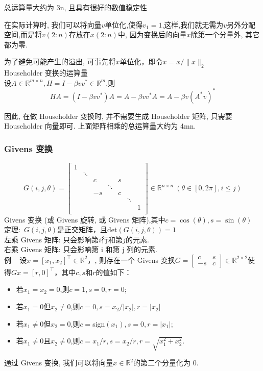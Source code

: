 \documentclass[12pt,a4paper]{article}
\begin{document}
总运算量大约为 3n, 且具有很好的数值稳定性

在实际计算时, 我们可以将向量$v$单位化,使得$v_1=1$,这样,我们就无需为$v$另外分配空间,而是将$v(2:n)$存放在$x(2:n)$中, 因为变换后的向量$x$除第一个分量外, 其它都为零.

为了避免可能产生的溢出, 可事先将$x$单位化，即令$x=x/\|x\|_2$\\

\noindent Householder 变换的运算量\\
设$A \in \mathbb{R}^{m \times n}, H=I-\beta v v^{*} \in \mathbb{R}^{m}$,则$$
H A=\left(I-\beta v v^{*}\right) A=A-\beta v v^{*} A=A-\beta v\left(A^{*} v\right)^{*}
$$

因此, 在做 Householder 变换时, 并不需要生成 Householder 矩阵, 只需要
Householder 向量即可. 上面矩阵相乘的总运算量大约为 4mn.
\subsubsection{Givens 变换}
$$G(i,j,\theta)=
\begin{bmatrix}
1& & & & & & \\
&\ddots& & & & & \\
& &c& &s& & \\
& & & \ddots& & & \\
& &-s& &c & & \\
& & & & &\ddots& \\
&&&&&&1\\
\end{bmatrix}\in \mathbb{R}^{n\times n} ~(\theta \in [0,2 \pi],i\leqslant j)
$$
Givens 变换 (或 Givens 旋转, 或 Givens 矩阵),其中$c=\cos(\theta),s=\sin (\theta)$\\

\noindent 定理:~$G(i,j,\theta)$是正交矩阵，且det$(G(i,j,\theta))=1$\\

\noindent 左乘 Givens 矩阵: 只会影响第$i$行和第$j$的元素.\\
右乘 Givens 矩阵: 只会影响第 i 和第 j 列的元素.\\

\noindent 例 ~ 设$x=\left[x_{1}, x_{2}\right]^{\top} \in \mathbb{R}^{2}$，, 则存在一个 Givens 变换$G=\left[\begin{array}{cc}{c} & {s} \\ {-s} & {c}\end{array}\right] \in \mathbb{R}^{2 \times 2}$使得$G x=[r, 0]^{\top}$，其中$c,s$和$r$的值如下：
\begin{itemize}
	\item {若$x_1=x_2=0$,则$c=1,s=0,r=0$;}
	\item{若$x_1=0$但$x_2\ne0$,则$c=0,s=x_2/\left|x_2\right|,r=\left|x_2\right|$}
	\item 若$x_1\ne 0$但$x_2=0$,则$c=$sign$(x_1),s=0,r=\left|x_1\right|$;
	\item 若$x_1\ne 0$且$x_2\ne 0$,则$c=x_1/r,s=x_2/r,r=\sqrt{x_1^2+x_2^2}$.
\end{itemize}
通过 Givens 变换, 我们可以将向量$x \in \mathbb{R}^2$的第二个分量化为 0.\\
\end{document}
